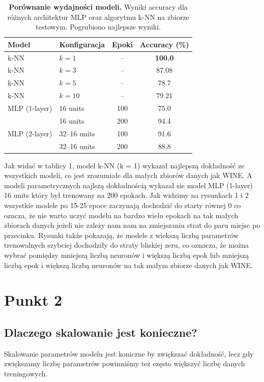 \documentclass[12pt,a4paper]{article}
\begin{document}
\begin{table}[t] %
\centering
\caption{\textbf{Porównanie wydajności modeli.} Wyniki accuracy dla różnych architektur MLP oraz algorytmu k-NN na zbiorze testowym. Pogrubiono najlepsze wyniki.}
\label{tab:results}
\vspace{2mm} %
\begin{tabular}{llcc}
\toprule
\textbf{Model} & \textbf{Konfiguracja} & \textbf{Epoki} & \textbf{Accuracy (\%)} \\
\midrule
k-NN & $k=1$ & -- & \textbf{100.0} \\
k-NN & $k=3$ & -- & 87.08 \\
k-NN & $k=5$ & -- & 78.7 \\
k-NN & $k=10$ & -- & 79.21 \\
\midrule
MLP (1-layer) & 16 units & 100 & 75.0 \\
              & 16 units & 200 & 94.4 \\
\addlinespace %
MLP (2-layer) & 32--16 units & 100 & 91.6 \\
              & 32--16 units & 200 & 88.8 \\
\bottomrule
\end{tabular}
\end{table}

Jak widać w tablicy 1, model k-NN (k = 1) wykazał najlepszą dokładność ze wszystkich modeli, co jest zrozumiałe dla małych zbiorów danych jak WINE. A modeli parametrycznych najlszą dokładnością wykazał sie model MLP (1-layer) 16 units który był trenowany na 200 epokach. Jak widzimy na rysunkach 1 i 2 wszystkie modele po
15-25 epoce zaczynają dochodzić do starty równej 0 co ozncza, że nie warto uczyć modelu na bardzo wielu epokach na tak małych zbiorach danych jeżeli nie zależy nam nam na zmiejszaniu strat do paru miejsc po przecinku. Rysunki także pokazają, że modele z wiekszą liczbą parametrów trenowalnych szybciej dochodziły do straty bliskiej zeru, co oznacza, że można wybrać pomiędzy 
mniejszą liczbą neuronów i większą liczbą epok lub mniejszą liczbą epok i większą liczbą neuronów na tak małym zbiorze danych jak WINE.

\section{Punkt 2}
\subsection{Dlaczego skalowanie jest konieczne?}
Skalowanie parametrów modelu jest koniczne by zwiększać dokładność, lecz gdy zwiększamy liczbę parametrów powinniśmy też często większyć liczbę danych treningowych.
\end{document}
